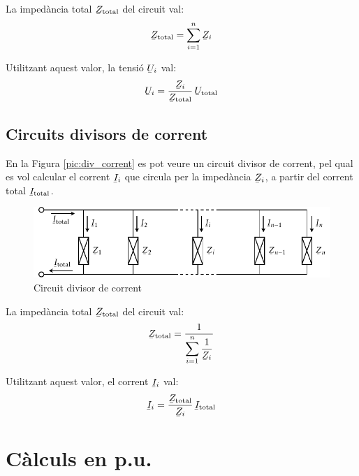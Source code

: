 La imped\`{a}ncia total $\cmplx{Z}\ped{total}$ del circuit val:
\begin{equation}
    \cmplx{Z}\ped{total} = \sum_{i=1}^n \cmplx{Z}_i
\end{equation}

Utilitzant aquest valor, la tensi\'{o} $\cmplx{U}_i$ val:
\begin{equation}
    \cmplx{U}_i = \frac{\cmplx{Z}_i}{\cmplx{Z}\ped{total}}\,\cmplx{U}\ped{total}
\end{equation}

\subsection{Circuits divisors de corrent}

En la Figura \vref{pic:div_corrent} es pot veure un circuit divisor
de corrent, pel qual es vol calcular el corrent $\cmplx{I}_i$ que
circula per la imped\`{a}ncia $\cmplx{Z}_i$, a partir del corrent total
$\cmplx{I}\ped{total}$.
\begin{figure}[htb]
\centering
    \includegraphics{Imatges/Cap-Fonaments-Divisor-Corrent.pdf}
\caption{Circuit divisor de corrent} \label{pic:div_corrent}
\end{figure}

La imped\`{a}ncia total $\cmplx{Z}\ped{total}$ del circuit val:
\begin{equation}
    \cmplx{Z}\ped{total} = \frac{1}{\displaystyle\sum_{i=1}^n \frac{1}{\cmplx{Z}_i}}
\end{equation}

Utilitzant aquest valor, el corrent $\cmplx{I}_i$ val:
\begin{equation}
    \cmplx{I}_i = \frac{\cmplx{Z}\ped{total}}{\cmplx{Z}_i}\,\cmplx{I}\ped{total}
\end{equation}



\section{C\`{a}lculs en p.u.} \label{sec:seccio_pu} 

